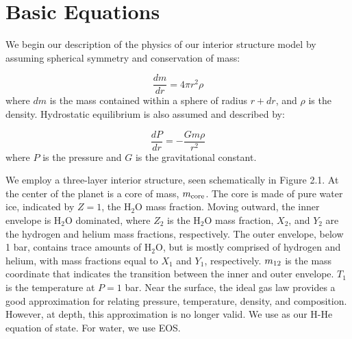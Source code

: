 \documentclass[11pt]{ucscthesisbs}
\begin{document}
\section{Basic Equations}
\label{Three-layer Model with Dry Adiabat}
We begin our description of the physics of our interior structure model by assuming spherical symmetry and conservation of mass:

\begin{equation}
  \frac{dm}{dr} =4 \pi r^{2}\rho  
\end{equation}
where $dm$ is the mass contained within a sphere of radius $r + dr$, and $\rho$ is the density. Hydrostatic equilibrium is also assumed and described by:

\begin{equation}
  \frac{dP}{dr} = -\frac{Gm\rho}{r^{2}}  
\end{equation}
where $P$ is the pressure and $G$ is the gravitational constant. 

We employ a three-layer interior structure, seen schematically in Figure 2.1. At the center of the planet is a core of mass, $m_{\rm core}$. The core is made of pure water ice, indicated by $Z = 1$, the H$_{2}$O mass fraction. Moving outward, the inner envelope is H$_{2}$O dominated, where $Z_{2}$ is the H$_{2}$O mass fraction, $X_{2}$, and $Y_{2}$ are the hydrogen and helium mass fractions, respectively. The outer envelope, below 1 bar, contains trace amounts of H$_{2}$O, but is mostly comprised of hydrogen and helium, with mass fractions equal to $X_{1}$ and $Y_{1}$, respectively. $m_{\rm 12}$ is the mass coordinate that indicates the transition between the inner and outer envelope. $T_{1}$ is the temperature at $P=1$ bar. Near the surface, the ideal gas law provides a good approximation for relating pressure, temperature, density, and composition. However, at depth, this approximation is no longer valid. We use \citep{chabrier_eos} as our H-He equation of state. For water, we use \citep{mazevet_2019} EOS. 
\end{document}
